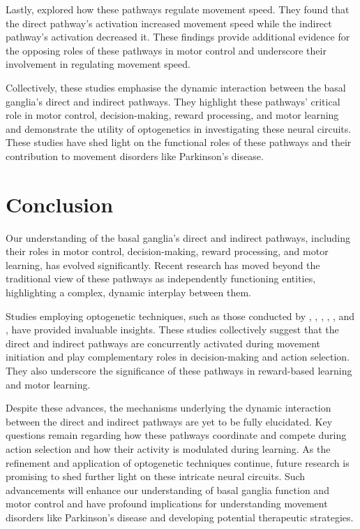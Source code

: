 \documentclass[10pt]{article}
\begin{document}
\begin{sloppypar}
  Lastly, \cite{wang_direct_2015} explored how these pathways regulate movement speed. They found that the direct pathway’s activation increased movement speed while the indirect pathway’s activation decreased it. These findings provide additional evidence for the opposing roles of these pathways in motor control and underscore their involvement in regulating movement speed.

  Collectively, these studies emphasise the dynamic interaction between the basal ganglia’s direct and indirect pathways. They highlight these pathways’ critical role in motor control, decision-making, reward processing, and motor learning and demonstrate the utility of optogenetics in investigating these neural circuits. These studies have shed light on the functional roles of these pathways and their contribution to movement disorders like Parkinson’s disease.

  \section{Conclusion}
  \label{sec:conclusion}

  Our understanding of the basal ganglia’s direct and indirect pathways, including their roles in motor control, decision-making, reward processing, and motor learning, has evolved significantly. Recent research has moved beyond the traditional view of these pathways as independently functioning entities, highlighting a complex, dynamic interplay between them.

  Studies employing optogenetic techniques, such as those conducted by \cite{cui_concurrent_2013}, \cite{kravitz_regulation_2010}, \cite{yttri_opponent_2016}, \cite{guillaumin_optogenetic_2020}, \cite{hilt_evidence_2016}, and \cite{wang_direct_2015}, have provided invaluable insights. These studies collectively suggest that the direct and indirect pathways are concurrently activated during movement initiation and play complementary roles in decision-making and action selection. They also underscore the significance of these pathways in reward-based learning and motor learning.

  Despite these advances, the mechanisms underlying the dynamic interaction between the direct and indirect pathways are yet to be fully elucidated. Key questions remain regarding how these pathways coordinate and compete during action selection and how their activity is modulated during learning. As the refinement and application of optogenetic techniques continue, future research is promising to shed further light on these intricate neural circuits. Such advancements will enhance our understanding of basal ganglia function and motor control and have profound implications for understanding movement disorders like Parkinson’s disease and developing potential therapeutic strategies.

  \pagebreak
  \singlespacing %
  
  

\end{sloppypar}
\end{document}
